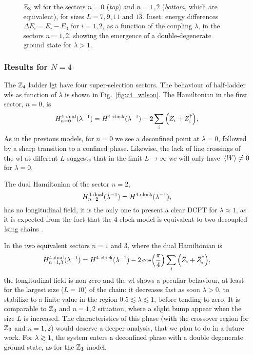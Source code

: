 \begin{figure}[t]
    \centering
    
    \vspace*{-10pt}
    \caption[\ac{wl}s for the $\Z_3$ ladder \ac{lgt}]{$\Z_3$ \ac{wl} for the sectors $n=0$ (\emph{top}) and $n=1,2$ (\emph{bottom}, which are equivalent), for sizes $L = 7,9,11$ and $13$.
       Inset: energy differences $\Delta E_i = E_i - E_0$ for $i=1,2$, as a function of the coupling $\lambda$, in the sectors $n=1,2$, showing the emergence of a double-degenerate ground state for $\lambda > 1$.
}
    \label{fig:z3_wilson}
\end{figure}



\subsubsection*{Results for \texorpdfstring{$N=4$}{N=4}}%


The $\Z_4$ ladder \ac{lgt} have four super-selection sectors.
The behaviour of half-ladder \ac{wl}s as function of $\lambda$ is shown in Fig.~\ref{fig:z4_wilson}.
The Hamiltonian in the first sector, $n=0$, is
\begin{equation}
    \HamilDual[4]_{n=0}(\lambda^{-1}) = \HamilClock[4](\lambda^{-1}) - 2 \sum_{i} \qty(Z_i + Z_i^{\dagger}),
\end{equation}
As in the previous models, for $n=0$ we see a deconfined point at $\lambda = 0$, followed by a sharp transition to a confined phase.
Likewise, the lack of line crossings of the \ac{wl} at different $L$ suggests that in the limit $L \to \infty$ we will only have $\ev*{W} \neq 0$ for $\lambda = 0$.

The dual Hamiltonian of the sector $n=2$,
\begin{equation}
    \HamilDual[4]_{n=2}(\lambda^{-1}) = \HamilClock[4](\lambda^{-1}),
\end{equation}
has no longitudinal field, it is the only one to present a clear DCPT for $\lambda \approx 1$, as it is expected from the fact that the $4$-clock model is equivalent to two decoupled Ising chains \cite{ortiz2012dualities}.

In the two equivalent sectors $n=1$ and $3$, where the dual Hamiltonian is
\begin{equation}
    \HamilDual[4]_{n=1,3}(\lambda^{-1}) =
    \HamilClock[4](\lambda^{-1}) - 2 \cos( \frac{\pi}{4} ) \sum_{i} \qty(\tilde{Z}_i + \tilde{Z}_i^{\dagger}),
\end{equation}
the longitudinal field is non-zero and the \ac{wl} shows a peculiar behaviour, at least for the largest size ($L=10$) of the chain: it decreases fast as soon $\lambda > 0$, to stabilize to a finite value in the region $0.5 \lesssim \lambda \lesssim 1$, before tending to zero.
It is comparable to $\Z_3$ and $n=1,2$ situation, where a slight bump appear when the size $L$ is increased.
The characteristics of this phase (with the crossover region for $\Z_3$ and $n=1,2$) would deserve a deeper analysis, that we plan to do in a future work.
For $\lambda \gtrsim 1$, the system enters a deconfined phase with a double degenerate ground state, as for the $\Z_3$ model.


